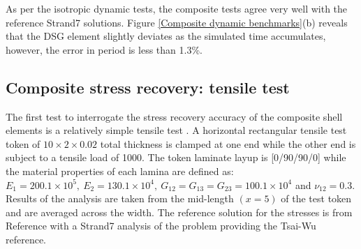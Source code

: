 As per the isotropic dynamic tests, the composite tests agree very well with the reference Strand7 solutions. Figure \ref{Composite dynamic benchmarks}(b) reveals that the DSG element slightly deviates as the simulated time accumulates, however, the error in period is less than 1.3\%.

\subsection{Composite stress recovery: tensile test}
The first test to interrogate the stress recovery accuracy of the composite shell elements is a relatively simple tensile test \cite{nasanettles1994}. A horizontal rectangular tensile test token of $10\times2\times0.02$ total thickness is clamped at one end while the other end is subject to a tensile load of 1000. The token laminate layup is [0/90/90/0] while the material properties of each lamina are defined as: $E_1 = 200.1\times10^5,\ E_2 = 130.1\times10^4,\ G_{12} = G_{13} = G_{23} = 100.1\times10^4$ and $\nu_{12} = 0.3$. Results of the analysis are taken from the mid-length $(x=5)$ of the test token and are averaged across the width. The reference solution for the stresses is from Reference \cite{nasanettles1994} with a Strand7 analysis of the problem providing the Tsai-Wu reference. 

